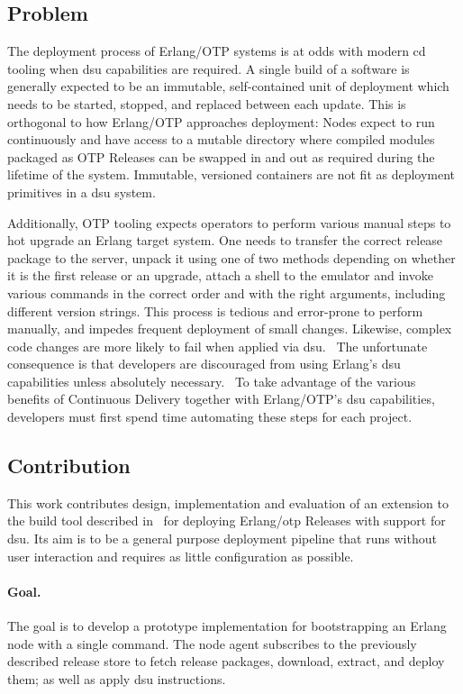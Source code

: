 \subsection{Problem}\label{sec:problem}
The deployment process of Erlang/OTP systems is at odds with modern \acrfull{cd} tooling when \acrshort{dsu} capabilities are required. A single build of a software is generally expected to be an immutable, self-contained unit of deployment which needs to be started, stopped, and replaced between each update. This is orthogonal to how Erlang/OTP approaches deployment: Nodes expect to run continuously and have access to a mutable directory where compiled modules packaged as OTP Releases can be swapped in and out as required during the lifetime of the system. Immutable, versioned containers are not fit as deployment primitives in a \acrshort{dsu} system.

Additionally, OTP tooling expects operators to perform various manual steps to hot upgrade an Erlang target system. One needs to transfer the correct release package to the server, unpack it using one of two methods depending on whether it is the first release or an upgrade, attach a shell to the emulator and invoke various commands in the correct order and with the right arguments, including different version strings.
This process is tedious and error-prone to perform manually, and impedes frequent deployment of small changes. Likewise, complex code changes are more likely to fail when applied via \acrshort{dsu}.~\cite{hicks} The unfortunate consequence is that developers are discouraged from using Erlang's \acrshort{dsu} capabilities unless absolutely necessary.~\cite{ferd} To take advantage of the various benefits of Continuous Delivery together with Erlang/OTP's \acrshort{dsu} capabilities, developers must first spend time automating these steps for each project.

\cleardoublepage
\subsection{Contribution}

This work contributes design, implementation and evaluation of an extension to the build tool described in~\cite{zak18} for deploying Erlang/\acrshort{otp} Releases with support for \acrshort{dsu}. Its aim is to be a general purpose deployment pipeline that runs without user interaction and requires as little configuration as possible.

\paragraph{Goal.} The goal is to develop a prototype implementation for bootstrapping an Erlang node with a single command. The node agent subscribes to the previously described release store to fetch release packages, download, extract, and deploy them; as well as apply \acrshort{dsu} instructions.

